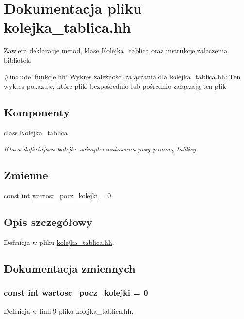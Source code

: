 \hypertarget{kolejka__tablica_8hh}{\section{\-Dokumentacja pliku kolejka\-\_\-tablica.\-hh}
\label{kolejka__tablica_8hh}
}


\-Zawiera deklaracje metod, klase \hyperlink{class_kolejka__tablica}{\-Kolejka\-\_\-tablica} oraz instrukcje zalaczenia bibliotek.  


{\ttfamily \#include \char`\"{}funkcje.\-hh\char`\"{}}\*
\-Wykres zależności załączania dla kolejka\-\_\-tablica.\-hh\-:
\-Ten wykres pokazuje, które pliki bezpośrednio lub pośrednio załączają ten plik\-:
\subsection*{\-Komponenty}
\begin{DoxyCompactItemize}
\item 
class \hyperlink{class_kolejka__tablica}{\-Kolejka\-\_\-tablica}
\begin{DoxyCompactList}\small\item\em \-Klasa definiujaca kolejke zaimplementowana przy pomocy tablicy. \end{DoxyCompactList}\end{DoxyCompactItemize}
\subsection*{\-Zmienne}
\begin{DoxyCompactItemize}
\item 
const int \hyperlink{kolejka__tablica_8hh_a8cde1be11cf3e1b63ede6c2ea418322f}{wartosc\-\_\-pocz\-\_\-kolejki} = 0
\end{DoxyCompactItemize}


\subsection{\-Opis szczegółowy}


\-Definicja w pliku \hyperlink{kolejka__tablica_8hh_source}{kolejka\-\_\-tablica.\-hh}.



\subsection{\-Dokumentacja zmiennych}
\hypertarget{kolejka__tablica_8hh_a8cde1be11cf3e1b63ede6c2ea418322f}{
\subsubsection[{wartosc\-\_\-pocz\-\_\-kolejki}]{\setlength{\rightskip}{0pt plus 5cm}const int {\bf wartosc\-\_\-pocz\-\_\-kolejki} = 0}}\label{kolejka__tablica_8hh_a8cde1be11cf3e1b63ede6c2ea418322f}


\-Definicja w linii 9 pliku kolejka\-\_\-tablica.\-hh.

